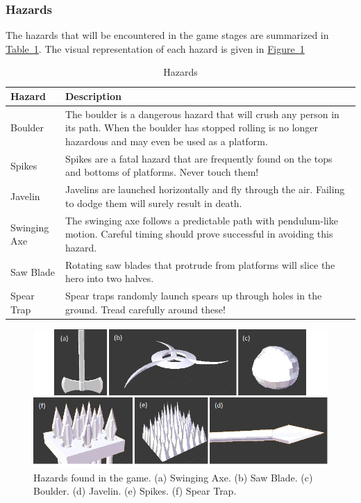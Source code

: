 \documentclass[12pt, titlepage]{article}
\begin{document}
\subsubsection{Hazards}
The hazards that will be encountered in the game stages are summarized in \hyperref[tab:hazards]{Table~\ref*{tab:hazards}}.  The visual representation of each hazard is given in \hyperref[fig:hazards]{Figure~\ref*{fig:hazards}}

\begin{table}[H]
\caption{Hazards} \label{tab:hazards}
\renewcommand{\arraystretch}{1.2}
\begin{tabularx}{\textwidth}{p{4cm}X}
\toprule {\bf Hazard} & {\bf Description}\\
\midrule
Boulder & The boulder is a dangerous hazard that will crush any person in its path.  When the boulder has stopped rolling is no longer hazardous and may even be used as a platform.\\
Spikes & Spikes are a fatal hazard that are frequently found on the tops and bottoms of platforms.  Never touch them! \\
Javelin & Javelins are launched horizontally and fly through the air.  Failing to dodge them will surely result in death. \\
Swinging Axe & The swinging axe follows a predictable path with pendulum-like motion.  Careful timing should prove successful in avoiding this hazard. \\
Saw Blade & Rotating saw blades that protrude from platforms will slice the hero into two halves. \\
Spear Trap & Spear traps randomly launch spears up through holes in the ground.  Tread carefully around these!\\
\bottomrule
\end{tabularx}
\end{table}

\begin{figure}[H]
\begin{center}
\includegraphics[width=\textwidth]{hazards}
\caption[Hazards found in the game.]{Hazards found in the game.  (a) Swinging Axe.  (b) Saw Blade.  (c) Boulder.  (d) Javelin.  (e) Spikes.  (f) Spear Trap.} \label{fig:hazards}
\end{center}
\end{figure}
\end{document}
